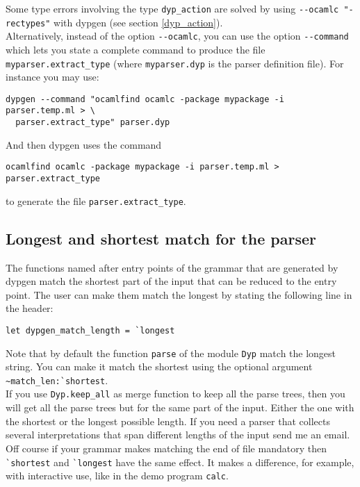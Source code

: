 \documentclass[12pt]{article}
\begin{document}
{Some type errors involving the type \verb|dyp_action| are solved by using \verb|--ocamlc "-rectypes"| with dypgen (see section \ref{dyp_action}).\\

Alternatively, instead of the option \verb|--ocamlc|, you can use the option \verb|--command| which lets you state a complete command to produce the file \verb|myparser.extract_type| (where \verb|myparser.dyp| is the parser definition file). For instance you may use:
\begin{verbatim}
dypgen --command "ocamlfind ocamlc -package mypackage -i parser.temp.ml > \
  parser.extract_type" parser.dyp
\end{verbatim}
And then dypgen uses the command
\begin{verbatim}
ocamlfind ocamlc -package mypackage -i parser.temp.ml > parser.extract_type
\end{verbatim}
to generate the file \verb|parser.extract_type|.

\subsection{Longest and shortest match for the parser}\label{match_length}

The functions named after entry points of the grammar that are generated by dypgen match the shortest part of the input that can be reduced to the entry point. The user can make them match the longest by stating the following line in the header:
\begin{verbatim}
let dypgen_match_length = `longest
\end{verbatim}
Note that by default the function \verb|parse| of the module \verb|Dyp| match the longest string. You can make it match the shortest using the optional argument \verb|~match_len:`shortest|.\\

If you use \verb|Dyp.keep_all| as merge function to keep all the parse trees, then you will get all the parse trees but for the same part of the input. Either the one with the shortest or the longest possible length. If you need a parser that collects several interpretations that span different lengths of the input send me an email.\\

Off course if your grammar makes matching the end of file mandatory then \verb|`shortest| and \verb|`longest| have the same effect. It makes a difference, for example, with interactive use, like in the demo program \verb|calc|.\\

}
\end{document}
